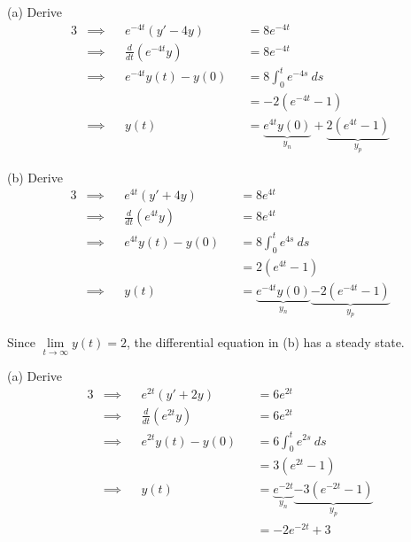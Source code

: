 \documentclass[a4paper]{article}
\begin{document}
(a) Derive
\begin{alignat*}{3}
	&\implies && e^{-4t} \!\left( y' - 4y \right) && = 8e^{-4t} \\
	&\implies && \frac{d }{d t} \!\left( e^{-4t}y \right) && = 8e^{-4t} \\ 
	&\implies && e^{-4t} y \!\left( t \right) - y \!\left( 0 \right) && = 8 \int^{t}_{0} e^{-4s} \ ds \\
	& && && = -2 \!\left( e^{-4t} - 1 \right) \\
	&\implies && y \!\left( t \right) && = \underbrace{e^{4t} y \!\left( 0 \right)}_{y_{n}} + \underbrace{2 \!\left( e^{4t} - 1 \right)}_{y_{p}}
\end{alignat*}

(b) Derive
\begin{alignat*}{3}
	&\implies && e^{4t} \!\left( y' + 4y \right) && = 8e^{4t} \\
	&\implies && \frac{d }{d t} \!\left( e^{4t}y \right) && = 8e^{4t} \\ 
	&\implies && e^{4t} y \!\left( t \right) - y \!\left( 0 \right) && = 8 \int^{t}_{0} e^{4s} \ ds \\
	& && && = 2 \!\left( e^{4t} - 1 \right) \\
	&\implies && y \!\left( t \right) && = \underbrace{e^{-4t} y \!\left( 0 \right) }_{y_{n}} \underbrace{-2 \!\left( e^{-4t} - 1 \right) }_{y_{p}}
\end{alignat*}

Since \(\lim\limits_{t \to \infty} y \!\left( t \right) = 2\), the differential equation in (b) has a steady state.

\vspace{12pt}


(a) Derive
\begin{alignat*}{3}
	&\implies && e^{2t} \!\left( y' + 2y \right) && = 6 e^{2t} \\
	&\implies && \frac{d }{d t} \!\left( e^{2t}y \right) && = 6e^{2t}  \\
	&\implies && e^{2t}y \!\left( t \right) - y \!\left( 0 \right) && = 6 \int^{t}_{0} e^{2s} \ ds \\
	& && && = 3 \!\left( e^{2t} - 1 \right) \\
	&\implies && y \!\left( t \right) && = \underbrace{e^{-2t}}_{y_{n}} \underbrace{- 3 \!\left( e^{-2t} - 1 \right) }_{y_{p}} \\
	& && && = -2e^{-2t} + 3
\end{alignat*}
\end{document}
